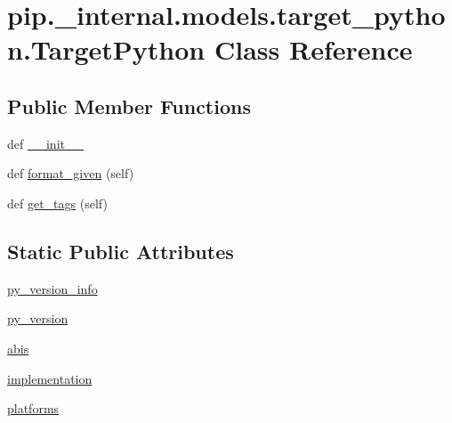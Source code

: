 \hypertarget{classpip_1_1__internal_1_1models_1_1target__python_1_1TargetPython}{}\section{pip.\+\_\+internal.\+models.\+target\+\_\+python.\+Target\+Python Class Reference}
\label{classpip_1_1__internal_1_1models_1_1target__python_1_1TargetPython}
\subsection*{Public Member Functions}
\begin{DoxyCompactItemize}
\item 
def \hyperlink{classpip_1_1__internal_1_1models_1_1target__python_1_1TargetPython_a3a4ccfe8da3b8a7e804e2fb6c9672cbd}{\+\_\+\+\_\+init\+\_\+\+\_\+}
\item 
def \hyperlink{classpip_1_1__internal_1_1models_1_1target__python_1_1TargetPython_abf89d4e534ad1d3e3fe151f3dc49046e}{format\+\_\+given} (self)
\item 
def \hyperlink{classpip_1_1__internal_1_1models_1_1target__python_1_1TargetPython_a03f74edf70da08177b563c742106b510}{get\+\_\+tags} (self)
\end{DoxyCompactItemize}
\subsection*{Static Public Attributes}
\begin{DoxyCompactItemize}
\item 
\hyperlink{classpip_1_1__internal_1_1models_1_1target__python_1_1TargetPython_a7fbbd14b2e1f11a0cb3a325711a74dca}{py\+\_\+version\+\_\+info}
\item 
\hyperlink{classpip_1_1__internal_1_1models_1_1target__python_1_1TargetPython_afe336d7c37905cb700215fc8033e3a41}{py\+\_\+version}
\item 
\hyperlink{classpip_1_1__internal_1_1models_1_1target__python_1_1TargetPython_a5b699558104cc1d30a408d4196ee1275}{abis}
\item 
\hyperlink{classpip_1_1__internal_1_1models_1_1target__python_1_1TargetPython_a75eb48f132e7ceb704546ab346fe3a49}{implementation}
\item 
\hyperlink{classpip_1_1__internal_1_1models_1_1target__python_1_1TargetPython_ac332e26af68ba8044718b8504f19dccd}{platforms}
\end{DoxyCompactItemize}


